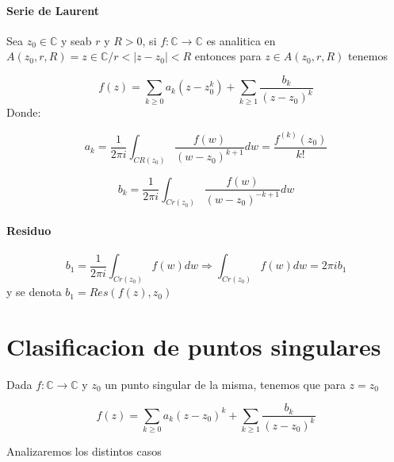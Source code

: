\documentclass[10pt]{article}
\begin{document}
\paragraph{Serie de Laurent}

Sea $z_0 \in \mathbb{C}$ y seab $r$ y $R > 0$, si $f: \mathbb{C} \rightarrow \mathbb{C}$ es analitica en $A(z_0,r,R) = {z\in \mathbb{C} / r<|z-z_0|<R}$ entonces para $z\in A(z_0,r,R)$ tenemos

\begin{equation*}
	f(z) = \sum_{k \geq 0} a_k(z-z_0^k) + \sum_{k \geq 1} \dfrac{b_k}{(z-z_0)^k}
\end{equation*} 
Donde:

\begin{equation*}
	a_k = \frac{1}{2\pi i} \int_{CR(z_0)} \dfrac{f(w)}{(w-z_0)^{k+1}}dw = \dfrac{f^{(k)}(z_0)}{k!}
\end{equation*}

\begin{equation*}
	b_k = \frac{1}{2\pi i} \int_{Cr(z_0)} \dfrac{f(w)}{(w-z_0)^{-k+1}}dw
\end{equation*}

\paragraph{Residuo}
\begin{equation*}
	b_1 = \frac{1}{2\pi i} \int_{Cr(z_0)} f(w)dw \Rightarrow \int_{Cr(z_0)}f(w)dw = 2\pi i b_1
\end{equation*}
y se denota $b_1 = Res(f(z), z_0)$

\section{Clasificacion de puntos singulares}

Dada $f: \mathbb{C} \rightarrow \mathbb{C}$ y $z_0$ un punto singular de la misma, tenemos que para $z=z_0$

\begin{equation*}
	f(z) = \sum_{k\geq 0} a_k(z-z_0)^k + \sum_{k \geq 1} \dfrac{b_k}{(z-z_0)^k} 
\end{equation*}

Analizaremos los distintos casos
\end{document}
